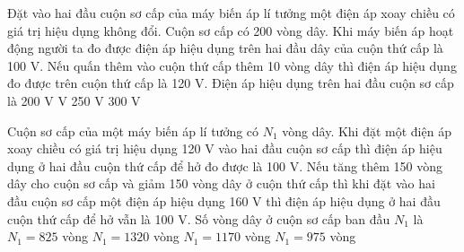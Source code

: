 \begin{vidu} %
	Đặt vào hai đầu cuộn sơ cấp của máy biến áp lí tưởng một điện áp xoay chiều có giá trị hiệu dụng không đổi. Cuộn sơ cấp có 200 vòng dây. Khi máy biến áp hoạt động người ta đo được điện áp hiệu dụng trên hai đầu dây của cuộn thứ cấp là 100 V. Nếu quấn thêm vào cuộn thứ cấp thêm 10 vòng dây thì điện áp hiệu dụng đo được trên cuộn thứ cấp là 120 V. Điện áp hiệu dụng trên hai đầu cuộn sơ cấp là
	\choice
	{200 V}
	{ V}
	{250 V}
	{300 V}
\end{vidu}
\begin{vidu} %
	Cuộn sơ cấp của một máy biến áp lí tưởng có $N_1$ vòng dây. Khi đặt một điện áp xoay chiều có giá trị hiệu dụng 120 V vào hai đầu cuộn sơ cấp thì điện áp hiệu dụng ở hai đầu cuộn thứ cấp để hở đo được là 100 V. Nếu tăng thêm 150 vòng dây cho cuộn sơ cấp và giảm 150 vòng dây ở cuộn thứ cấp thì khi đặt vào hai đầu cuộn sơ cấp một điện áp hiệu dụng 160 V thì điện áp hiệu dụng ở hai đầu cuộn thứ cấp để hở vẫn là 100 V. Số vòng dây ở cuộn sơ cấp ban đầu $N_1$ là
	\choice
	{$N_1=825$ vòng}
	{$N_1=1320$ vòng}
	{\True $N_1=1170$ vòng}
	{$N_1=975$ vòng}
\end{vidu}
